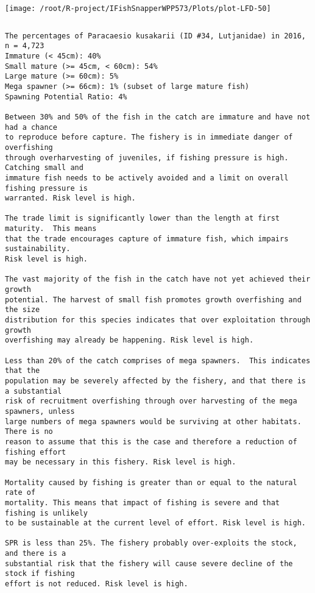 \documentclass{report}\usepackage[]{graphicx}\usepackage[]{color}
\makeatletter
\def\maxwidth{ %
  \ifdim\Gin@nat@width>\linewidth
    \linewidth
  \else
    \Gin@nat@width
  \fi
}
\newenvironment{kframe}{%
 \def\at@end@of@kframe{}%
 \ifinner\ifhmode%
  \def\at@end@of@kframe{\end{minipage}}%
  \begin{minipage}{\columnwidth}%
 \fi\fi%
 \def\FrameCommand##1{\hskip\@totalleftmargin \hskip-\fboxsep
 \colorbox{shadecolor}{##1}\hskip-\fboxsep
     \hskip-\linewidth \hskip-\@totalleftmargin \hskip\columnwidth}%
 \MakeFramed {\advance\hsize-\width
   \@totalleftmargin\z@ \linewidth\hsize
   \@setminipage}}%
 {\par\unskip\endMakeFramed%
 \at@end@of@kframe}
\newenvironment{knitrout}{}{} %
\makeatother
\begin{document}
\begin{knitrout}
\texttt{[image: /root/R-project/IFishSnapperWPP573/Plots/plot-LFD-50]} 
\begin{kframe}\begin{verbatim}
\end{verbatim}
\end{kframe}
\clearpage
\newpage
\begin{kframe}\begin{verbatim}The percentages of Paracaesio kusakarii (ID #34, Lutjanidae) in 2016, n = 4,723
Immature (< 45cm): 40%
Small mature (>= 45cm, < 60cm): 54%
Large mature (>= 60cm): 5%
Mega spawner (>= 66cm): 1% (subset of large mature fish)
Spawning Potential Ratio: 4%
 
Between 30% and 50% of the fish in the catch are immature and have not had a chance
to reproduce before capture. The fishery is in immediate danger of overfishing
through overharvesting of juveniles, if fishing pressure is high.  Catching small and
immature fish needs to be actively avoided and a limit on overall fishing pressure is
warranted. Risk level is high.

The trade limit is significantly lower than the length at first maturity.  This means
that the trade encourages capture of immature fish, which impairs sustainability.
Risk level is high.

The vast majority of the fish in the catch have not yet achieved their growth
potential. The harvest of small fish promotes growth overfishing and the size
distribution for this species indicates that over exploitation through growth
overfishing may already be happening. Risk level is high.

Less than 20% of the catch comprises of mega spawners.  This indicates that the
population may be severely affected by the fishery, and that there is a substantial
risk of recruitment overfishing through over harvesting of the mega spawners, unless
large numbers of mega spawners would be surviving at other habitats. There is no
reason to assume that this is the case and therefore a reduction of fishing effort
may be necessary in this fishery. Risk level is high.
 
Mortality caused by fishing is greater than or equal to the natural rate of
mortality. This means that impact of fishing is severe and that fishing is unlikely
to be sustainable at the current level of effort. Risk level is high.
 
SPR is less than 25%. The fishery probably over-exploits the stock, and there is a
substantial risk that the fishery will cause severe decline of the stock if fishing
effort is not reduced. Risk level is high.
 

\end{verbatim}
\end{kframe}
\end{knitrout}
\end{document}
